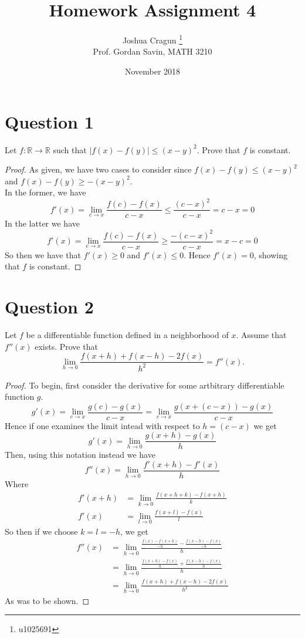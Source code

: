 \documentclass[12pt, letterpaper]{article}
\title{Homework Assignment 4}
\author{Joshua Cragun \thanks{u1025691} \\ Prof. Gordan Savin, MATH 3210}
\date{November 2018}
\begin{document}
\begin{titlepage}
\maketitle
\end{titlepage}

\section*{Question 1}
Let $f: \mathbb R \rightarrow \mathbb R$ such that $|f(x)-f(y)| \leq (x-y)^2$. Prove that $f$ is constant.

\begin{proof}
  As given, we have two cases to consider since $f(x)-f(y) \leq (x-y)^2$ and $f(x)-f(y) \geq -(x-y)^2$.\\

  \noindent In the former, we have
  $$ f'(x) = \lim_{c \to x} \frac{f(c) - f(x)}{c - x} \leq \frac{(c-x)^2}{c-x} = c-x = 0$$
  \noindent In the latter we have
  $$ f'(x) = \lim_{c \to x} \frac{f(c) - f(x)}{c - x} \geq \frac{-(c-x)^2}{c-x} = x-c = 0$$
  So then we have that $f'(x) \geq 0$ and $f'(x) \leq 0$. Hence $f'(x) = 0$, showing that $f$ is constant.
\end{proof}

\section*{Question 2}
Let $f$ be a differentiable function defined in a neighborhood of $x$. Assume  that $f''(x)$ exists. Prove that
\[
\lim_{h\rightarrow 0} \frac{f(x+h) + f(x-h) -2 f(x)}{h^2} = f''(x).
\]

\begin{proof}
  To begin, first consider the derivative for some artbitrary differentiable function $g$.
  $$ g'(x) = \lim_{c \to x} \frac{g(c) - g(x)}{c - x} = \lim_{c \to x} \frac{g(x + (c - x)) - g(x)}{c - x} $$
  Hence if one examines the limit intead with respect to $h = (c - x)$ we get
  $$ g'(x) = \lim_{h \to 0} \frac{g(x + h) - g(x)}{h}$$
  Then, using this notation instead we have
  $$ f''(x) = \lim_{h \to 0} \frac{f'(x + h) - f'(x)}{h} $$
  Where
  \begin{align*}
    f'(x + h) &= \lim_{k \to 0} \frac{f(x + h + k) - f(x + h)}{k}\\
    f'(x) &= \lim_{l \to 0} \frac{f(x + l) - f(x)}{l}
  \end{align*}
  So then if we choose $k = l = -h$, we get
  \begin{align*}
  f''(x) &= \lim_{h \to 0} \frac{ \frac{f(x) - f(x + h)}{-h} - \frac{f(x - h) - f(x)}{-h} }{h}\\
  &= \lim_{h \to 0} \frac{ \frac{f(x + h) - f(x)}{h} + \frac{f(x - h) - f(x)}{h} }{h} \\
  &= \lim_{h \to 0} \frac{f(x+h) + f(x-h) -2 f(x)}{h^2}
  \end{align*}
  As was to be shown.
\end{proof}
\end{document}
